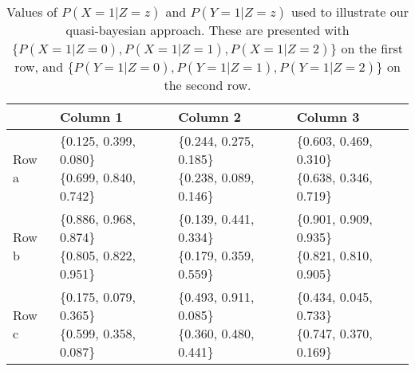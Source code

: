 \documentclass[
]{article}
\theoremstyle{plain}
\begin{document}
\begin{table}[H]
  \center
  \caption{Values of $P(X = 1 | Z = z)$ and $P(Y = 1 | Z = z)$ used to illustrate our quasi-bayesian approach. These are presented with $\{P(X = 1 | Z = 0), P(X = 1 | Z = 1), P(X = 1 | Z = 2)\}$ on the first row, and $\{P(Y = 1 | Z = 0), P(Y = 1 | Z = 1), P(Y = 1 | Z = 2)\}$ on the second row.}
  \label{tab:subset_plot_summaries_b}
  
\begin{tabular}{llll}
\toprule
  & Column 1 & Column 2 & Column 3\\
\midrule
Row a & \makecell[l]{\{0.125, 0.399, 0.080\}\\\{0.699, 0.840, 0.742\}} & \makecell[c]{\{0.244, 0.275, 0.185\}\\\{0.238, 0.089, 0.146\}} & \makecell[r]{\{0.603, 0.469, 0.310\}\\\{0.638, 0.346, 0.719\}}\\
Row b & \makecell[l]{\{0.886, 0.968, 0.874\}\\\{0.805, 0.822, 0.951\}} & \makecell[c]{\{0.139, 0.441, 0.334\}\\\{0.179, 0.359, 0.559\}} & \makecell[r]{\{0.901, 0.909, 0.935\}\\\{0.821, 0.810, 0.905\}}\\
Row c & \makecell[l]{\{0.175, 0.079, 0.365\}\\\{0.599, 0.358, 0.087\}} & \makecell[c]{\{0.493, 0.911, 0.085\}\\\{0.360, 0.480, 0.441\}} & \makecell[r]{\{0.434, 0.045, 0.733\}\\\{0.747, 0.370, 0.169\}}\\
\bottomrule
\end{tabular}


\end{table}
\end{document}
